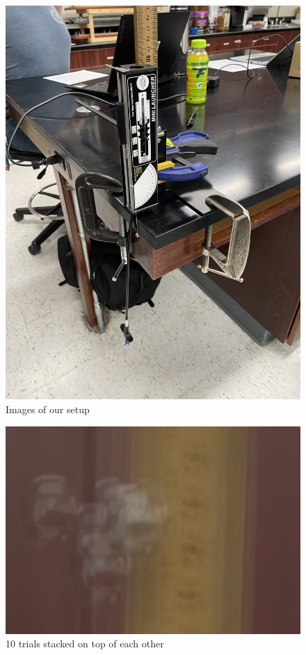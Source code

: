 \documentclass[letter paper, title page]{article}
\begin{document}
\begin{figure}[H]
    \includegraphics[scale=0.2, angle=-90]{images/IMG_8654.JPG}
    \caption{Images of our setup}
    \label{fig:my_label}
    
\end{figure}

\begin{figure}[H]
    \centering
    \includegraphics[scale=0.405]{images/10trialsballz.jpg}
    \caption{10 trials stacked on top of each other}
    \label{fig:my_label}
    
\end{figure}
\end{document}
